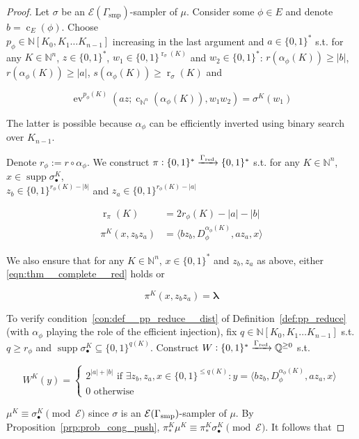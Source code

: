 \documentclass{article}
\numberwithin{equation}{section}
\theoremstyle{definition}
\theoremstyle{plain}
\newcommand{\Bool}{\{0,1\}}
\newcommand{\Words}{{\Bool^*}}
\DeclareMathOperator{\Supp}{supp}
\DeclareMathOperator{\Ev}{ev}
\DeclareMathOperator{\R}{r}
\DeclareMathOperator{\En}{c}
\newcommand{\Nats}{\mathbb{N}}
\newcommand{\Rats}{\mathbb{Q}}
\newcommand{\NatPoly}{\Nats[K_0, K_1 \ldots K_{n-1}]}
\newcommand{\Estr}{\bm{\lambda}}
\newcommand{\Abs}[1]{\lvert #1 \rvert}
\newcommand{\Chev}[1]{\langle #1 \rangle}
\newcommand{\Fall}{\mathcal{E}}
\begin{document}
\begin{proof}

Let ${\sigma}$ be an ${\Fall(\Gamma_{\text{smp}})}$-sampler of ${\mu}$. Consider some ${\phi \in E}$ and denote ${b=\En_E(\phi)}$. Choose\\ ${p_\phi \in \NatPoly}$ increasing in the last argument and ${a \in \Words}$ s.t. for any ${K \in \Nats^{n}}$, ${z \in \Words}$, ${w_1 \in \Bool^{\R_\sigma(K)}}$ and ${w_2 \in \Words}$: ${r(\alpha_\phi(K)) \geq \Abs{b}}$, ${r(\alpha_\phi(K)) \geq \Abs{a}}$, ${s(\alpha_\phi(K)) \geq \R_\sigma(K)}$ and 

\[\Ev^{p_\phi(K)}(az;\En_{\Nats^n}(\alpha_\phi(K)),w_1 w_2)=\sigma^{K}(w_1)\]

The latter is possible because ${\alpha_\phi}$ can be efficiently inverted using binary search over ${K_{n-1}}$.

Denote ${r_\phi := r \circ \alpha_\phi}$. We construct ${\pi: \Words \xrightarrow{\Gamma_{\textnormal{red}}} \Words}$ s.t. for any ${K \in \Nats^{n}}$, ${x \in \Supp \sigma_{\bullet}^{K}}$,\\  ${z_b \in \Bool^{r_\phi(K)-\Abs{b}}}$ and ${z_a \in \Bool^{r_\phi(K)-\Abs{a}}}$

\begin{align}
\R_\pi(K) &= 2r_\phi(K)-\Abs{a}-\Abs{b} \\
\label{eqn:thm__complete__red}\pi^{K}(x,z_b z_a)&=\Chev{bz_b,D_\phi^{\alpha_\phi(K)},a z_a, x} 
\end{align}

We also ensure that for any ${K \in \Nats^n}$, ${x \in \Words}$ and ${z_b,z_a}$ as above, either \ref{eqn:thm__complete__red} holds or 

\[\pi^K(x,z_b z_a)=\Estr\]

To verify condition~\ref{con:def__pp_reduce__dist} of Definition~\ref{def:pp_reduce} (with ${\alpha_\phi}$ playing the role of the efficient injection), fix ${q \in \NatPoly}$ s.t. $q \geq r_\phi$ and $\Supp \sigma_\bullet^K \subseteq \Bool^{q(K)}$. Construct ${W: \Words \xrightarrow{\Gamma_{\textnormal{red}}} \Rats^{\geq 0}}$ s.t. 

\[W^K(y)=\begin{cases}2^{\Abs{a}+\Abs{b}} \text{ if } \exists z_b,z_a,x \in \Bool^{\leq q(K)}: y=\Chev{bz_b,D_\phi^{\alpha_\phi(K)}, az_a,x}\\0 \text{ otherwise}\end{cases}\]

${\mu^K \equiv \sigma_\bullet^K \pmod{\Fall}}$ since ${\sigma}$ is an ${\Fall(\Gamma_{\textnormal{smp}})}$-sampler of ${\mu}$. By Proposition~\ref{prp:prob_cong_push}, ${\pi_*^K\mu^K \equiv \pi_*^K\sigma_\bullet^K \pmod{\Fall}}$. It follows that


\end{proof}
\end{document}
